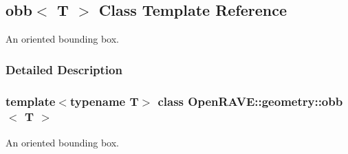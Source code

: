 \hypertarget{classOpenRAVE_1_1geometry_1_1obb}{
\subsection{obb$<$ T $>$ Class Template Reference}
\label{classOpenRAVE_1_1geometry_1_1obb}
}


An oriented bounding box.  




\subsubsection{Detailed Description}
\subsubsection*{template$<$typename T$>$ class OpenRAVE::geometry::obb$<$ T $>$}

An oriented bounding box. 